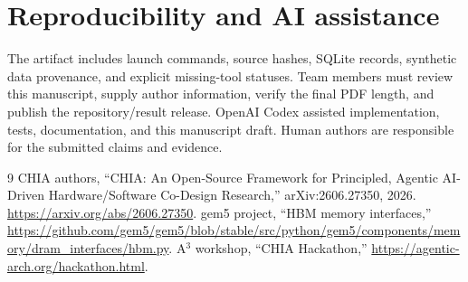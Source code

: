 \documentclass[conference]{IEEEtran}
\begin{document}
\section*{Reproducibility and AI assistance}
The artifact includes launch commands, source hashes, SQLite records, synthetic
data provenance, and explicit missing-tool statuses. Team members must review
this manuscript, supply author information, verify the final PDF length, and
publish the repository/result release. OpenAI Codex assisted implementation,
tests, documentation, and this manuscript draft. Human authors are responsible
for the submitted claims and evidence.

\begin{thebibliography}{9}
 CHIA authors, ``CHIA: An Open-Source Framework for Principled,
Agentic AI-Driven Hardware/Software Co-Design Research,'' arXiv:2606.27350, 2026.
\url{https://arxiv.org/abs/2606.27350}.
 gem5 project, ``HBM memory interfaces,''
\url{https://github.com/gem5/gem5/blob/stable/src/python/gem5/components/memory/dram_interfaces/hbm.py}.
 A$^3$ workshop, ``CHIA Hackathon,''
\url{https://agentic-arch.org/hackathon.html}.
\end{thebibliography}
\end{document}

